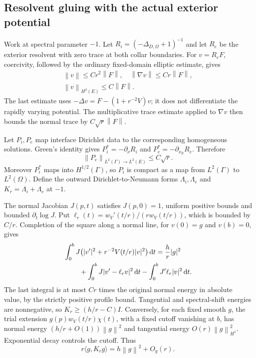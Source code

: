 \documentclass[aps,pra,reprint,superscriptaddress,longbibliography]{revtex4-2}
\newcommand{\dd}{\mathrm d}
\newcommand{\norm}[1]{\left\lVert#1\right\rVert}
\begin{document}
\subsection{Resolvent gluing with the actual exterior potential}

Work at spectral parameter $-1$. Let $R_i=(-\Delta_{D,\Omega}+1)^{-1}$ and let $R_e$ be the exterior resolvent with zero trace at both collar boundaries. For $v=R_eF$, coercivity, followed by the ordinary fixed-domain elliptic estimate, gives
\begin{equation}
 \begin{gathered}
 \norm v\le Cr^2\norm F,\quad
 \norm{\nabla v}\le Cr\norm F,\\
 \norm v_{H^2(E)}\le C\norm F.
 \end{gathered}\label{eq:exteriorres}
\end{equation}
The last estimate uses $-\Delta v=F-(1+r^{-2}V)v$; it does not differentiate the rapidly varying potential. The multiplicative trace estimate applied to $\nabla v$ then bounds the normal trace by $C\sqrt r\norm F$.

Let $P_i,P_e$ map interface Dirichlet data to the corresponding homogeneous solutions. Green's identity gives $P_i^*=-\partial_\nu R_i$ and $P_e^*=-\partial_{\nu_E}R_e$. Therefore
\begin{equation}
 \norm{P_e}_{L^2(\Gamma)\to L^2(E)}\le C\sqrt r.
 \label{eq:poissonex}
\end{equation}
Moreover $P_i^*$ maps into $H^{1/2}(\Gamma)$, so $P_i$ is compact as a map from $L^2(\Gamma)$ to $L^2(\Omega)$. Define the outward Dirichlet-to-Neumann forms $\Lambda_i,\Lambda_e$ and $K_r=\Lambda_i+\Lambda_e$ at $-1$.

The normal Jacobian $J(p,t)$ satisfies $J(p,0)=1$, uniform positive bounds and bounded $\partial_t\log J$. Put $\ell_r(t)=w_V'(t/r)/(r w_V(t/r))$, which is bounded by $C/r$. Completion of the square along a normal line, for $v(0)=g$ and $v(b)=0$, gives
\begin{align}
 &\int_0^bJ\bigl(|v'|^2+r^{-2}V(t/r)|v|^2\bigr)\,\dd t
       =\frac h r|g|^2\nonumber\\
 &\hspace{8mm}+\int_0^bJ|v'-\ell_rv|^2\,\dd t
              -\int_0^bJ'\ell_r|v|^2\,\dd t.\label{eq:normalfactor}
\end{align}
The last integral is at most $Cr$ times the original normal energy in absolute value, by the strictly positive profile bound. Tangential and spectral-shift energies are nonnegative, so $K_r\ge(h/r-C)I$. Conversely, for each fixed smooth $g$, the trial extension $g(p)w_V(t/r)\chi(t)$, with a fixed cutoff vanishing at $b$, has normal energy $(h/r+O(1))\norm g^2$ and tangential energy $O(r)\norm g_{H^1}^2$. Exponential decay controls the cutoff. Thus
\begin{equation}
 r\langle g,K_rg\rangle=h\norm g^2+O_g(r).\label{eq:boundaryform}
\end{equation}
\end{document}
